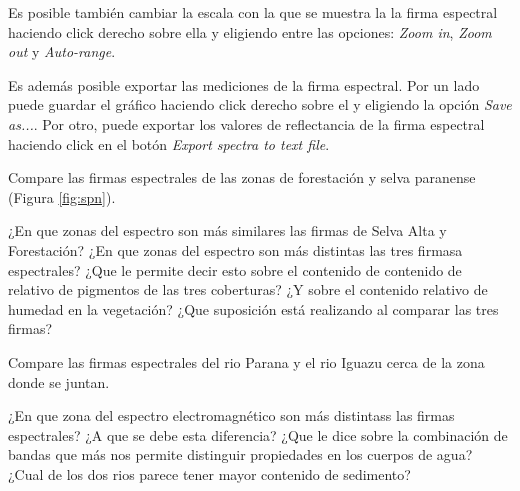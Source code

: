 \documentclass[a4paper,10pt]{book}
\begin{document}
Es posible también cambiar la escala con la que se muestra la la firma espectral haciendo click derecho sobre ella y eligiendo entre las opciones: \emph{Zoom in}, \emph{Zoom out} y \emph{Auto-range}.

Es además posible exportar las mediciones de la firma espectral. Por un lado puede guardar el gráfico haciendo click derecho sobre el y eligiendo la opción \emph{Save as...}. Por otro, puede exportar los valores de reflectancia de la firma espectral haciendo click en el botón \emph{Export spectra to text file}.

Compare las firmas espectrales de las zonas de forestación y selva paranense (Figura \ref{fig:spn}).

\begin{que}
    ¿En que zonas del espectro son más similares las firmas de Selva Alta y Forestación? ¿En que zonas del espectro son más distintas las tres firmasa espectrales? ¿Que le permite decir esto sobre el contenido de contenido de relativo de pigmentos de las tres coberturas? ¿Y sobre el contenido relativo de humedad en la vegetación? ¿Que suposición está realizando al comparar las tres firmas?
\end{que}

Compare las firmas espectrales del rio Parana y el rio Iguazu cerca de la zona donde se juntan.

\begin{que}
    ¿En que zona del espectro electromagnético son más distintass las firmas espectrales? ¿A que se debe esta diferencia? ¿Que le dice sobre la combinación de bandas que más nos permite distinguir propiedades en los cuerpos de agua? ¿Cual de los dos rios parece tener mayor contenido de sedimento?
\end{que}
\end{document}
